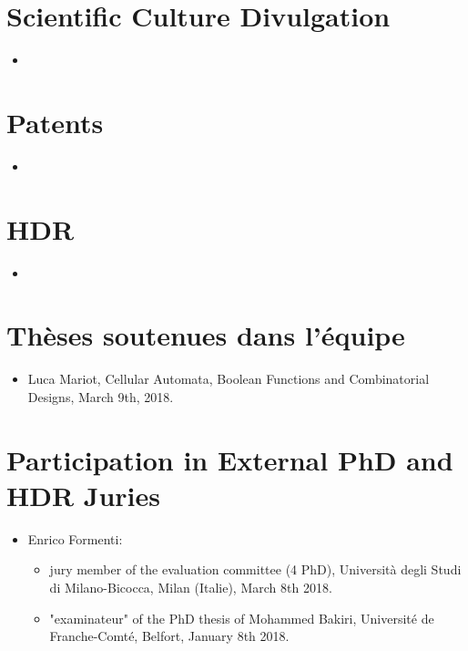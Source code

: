 \documentclass[a4paper]{article}
\begin{document}
\section{Scientific Culture Divulgation}
\begin{itemize}
\item 
\end{itemize}

\section{Patents}
\begin{itemize}
 \item
\end{itemize}

\section{HDR}
\begin{itemize}
 \item
\end{itemize}

\section{Thèses soutenues dans l'équipe}
\begin{itemize}
 \item Luca Mariot, Cellular Automata, Boolean Functions and Combinatorial Designs, March 9th, 2018.
\end{itemize}

\section{Participation in External PhD and HDR Juries}
\begin{itemize}

\item Enrico Formenti:
\begin{itemize}
\item jury member of the evaluation committee (4 PhD), Università degli Studi di Milano-Bicocca, Milan (Italie), March 8th 2018.
    \item "examinateur" of the PhD thesis  of Mohammed Bakiri, Université de Franche-Comté, Belfort, January 8th 2018.
    \end{itemize}

\end{itemize}
\end{document}
